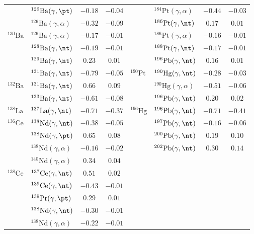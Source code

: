 {\begin{longtable}{llcc llcc}
$ $ & $^{126}\mathrm{Ba}(\gamma,\pt)$ & $-0.18$ & $-0.04$ & $ $ & $^{184}\mathrm{Pt}(\gamma,\alpha)$ & $-0.44$ & $-0.03$ \\ 
$ $ & $^{126}\mathrm{Ba}(\gamma,\alpha)$ & $-0.32$ & $-0.09$ & $ $ & $^{186}\mathrm{Pt}(\gamma,\nt)$ & $0.17$ & $0.01$ \\ 
$^{130}\mathrm{Ba}$ & $^{126}\mathrm{Ba}(\gamma,\alpha)$ & $-0.17$ & $-0.01$ & $ $ & $^{186}\mathrm{Pt}(\gamma,\alpha)$ & $-0.16$ & $-0.01$ \\ 
$ $ & $^{128}\mathrm{Ba}(\gamma,\nt)$ & $-0.19$ & $-0.01$ & $ $ & $^{188}\mathrm{Pt}(\gamma,\nt)$ & $-0.17$ & $-0.01$ \\ 
$ $ & $^{129}\mathrm{Ba}(\gamma,\nt)$ & $0.23$ & $0.01$ & $ $ & $^{196}\mathrm{Pb}(\gamma,\nt)$ & $0.16$ & $0.01$ \\ 
$ $ & $^{131}\mathrm{Ba}(\gamma,\nt)$ & $-0.79$ & $-0.05$ & $^{190}\mathrm{Pt}$ & $^{190}\mathrm{Hg}(\gamma,\nt)$ & $-0.28$ & $-0.03$ \\ 
$^{132}\mathrm{Ba}$ & $^{131}\mathrm{Ba}(\gamma,\nt)$ & $0.66$ & $0.09$ & $ $ & $^{190}\mathrm{Hg}(\gamma,\alpha)$ & $-0.51$ & $-0.06$ \\ 
$ $ & $^{133}\mathrm{Ba}(\gamma,\nt)$ & $-0.61$ & $-0.08$ & $ $ & $^{196}\mathrm{Pb}(\gamma,\nt)$ & $0.20$ & $0.02$ \\ 
$^{138}\mathrm{La}$ & $^{137}\mathrm{La}(\gamma,\nt)$ & $-0.71$ & $-0.37$ & $^{196}\mathrm{Hg}$ & $^{196}\mathrm{Pb}(\gamma,\nt)$ & $-0.71$ & $-0.41$ \\ 
$^{136}\mathrm{Ce}$ & $^{138}\mathrm{Nd}(\gamma,\nt)$ & $-0.38$ & $-0.05$ & $ $ & $^{197}\mathrm{Pb}(\gamma,\nt)$ & $-0.16$ & $-0.06$ \\ 
$ $ & $^{138}\mathrm{Nd}(\gamma,\pt)$ & $0.65$ & $0.08$ & $ $ & $^{200}\mathrm{Pb}(\gamma,\nt)$ & $0.19$ & $0.10$ \\ 
$ $ & $^{138}\mathrm{Nd}(\gamma,\alpha)$ & $-0.16$ & $-0.02$ & $ $ & $^{202}\mathrm{Pb}(\gamma,\nt)$ & $0.30$ & $0.14$ \\ 
$ $ & $^{140}\mathrm{Nd}(\gamma,\alpha)$ & $0.34$ & $0.04$ & $ $ & $ $ &  &  \\ 
$^{138}\mathrm{Ce}$ & $^{137}\mathrm{Ce}(\gamma,\nt)$ & $0.51$ & $0.02$ & $ $ & $ $ &  &  \\ 
$ $ & $^{139}\mathrm{Ce}(\gamma,\nt)$ & $-0.43$ & $-0.01$ & $ $ & $ $ &  &  \\ 
$ $ & $^{139}\mathrm{Pr}(\gamma,\pt)$ & $0.29$ & $0.01$ & $ $ & $ $ &  &  \\ 
$ $ & $^{138}\mathrm{Nd}(\gamma,\nt)$ & $-0.30$ & $-0.01$ & $ $ & $ $ &  &  \\ 
$ $ & $^{138}\mathrm{Nd}(\gamma,\alpha)$ & $-0.22$ & $-0.01$ & $ $ & $ $ &  &  \\ 
\end{longtable}
}

